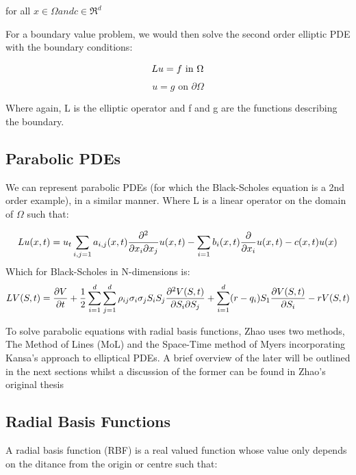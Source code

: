 \documentclass[a4paper]{amsart}
\begin{document}
for all $ x \in \Omega and c \in \Re^{d}$

For a boundary value problem, we would then solve the second order elliptic PDE with the boundary conditions:

\begin{equation}
Lu = f \mbox{ in } \Omega \\
\label{EPDE1}
\end{equation}
\begin{equation}
u = g \mbox{ on } \partial \Omega
\label{EPDE2}
\end{equation}

Where again, L is the elliptic operator and f and g are the functions describing the boundary.

\subsection{Parabolic PDEs}
We can represent parabolic PDEs (for which the Black-Scholes equation is a 2nd order example), in a similar manner. Where L is a linear operator on the domain of $\Omega$ such that:

\begin{equation}
Lu(x,t) = u_{t} \sum_{i,j=1} a_{i,j}(x,t) \pdv{}{x_i}{x_j} u(x,t) - \sum_{i=1} b_{i}(x,t) \pdv{}{x_i} u(x,t) - c(x,t) u(x)
\label{PPDE}
\end{equation}
Which for Black-Scholes in N-dimensions is:
\begin{equation}
LV(S,t) = \pdv{V}{t} + \frac{1}{2} \sum^{d}_{i=1} \sum^{d}_{j=1} \rho_{ij} \sigma_{i} \sigma_{j} S_{i} S_{j} \pdv{V(S,t)}{S_{i}}{S_{j}}+ \sum^{d}_{i=1}(r-q_{i})S_{1} \pdv{V(S,t)}{S_{i}} - rV(S,t)
\end{equation}

To solve parabolic equations with radial basis functions, Zhao uses two methods, The Method of Lines (MoL) and the Space-Time method of Myers incorporating Kansa's approach to elliptical PDEs. A brief overview of the later will be outlined in the next sections whilst a discussion of the former can be found in Zhao's original thesis \cite{}

\subsection{Radial Basis Functions}

A radial basis function (RBF) is a real valued function whose value only depends on the ditance from the origin or centre such that:
\end{document}
